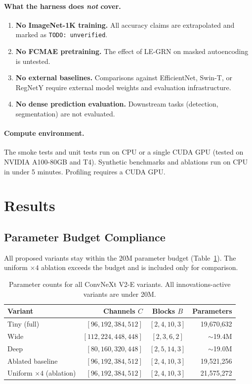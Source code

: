 \documentclass{article}
\begin{document}
\paragraph{What the harness does \emph{not} cover.}
\begin{enumerate}[nosep]
  \item \textbf{No ImageNet-1K training.}  All accuracy claims are
        extrapolated and marked as \texttt{TODO: unverified}.
  \item \textbf{No FCMAE pretraining.}  The effect of LE-GRN on
        masked autoencoding is untested.
  \item \textbf{No external baselines.}  Comparisons against
        EfficientNet, Swin-T, or RegNetY require external model
        weights and evaluation infrastructure.
  \item \textbf{No dense prediction evaluation.}  Downstream tasks
        (detection, segmentation) are not evaluated.
\end{enumerate}

\paragraph{Compute environment.}  The smoke tests and unit tests run on
CPU or a single CUDA GPU (tested on NVIDIA A100-80GB and T4).
Synthetic benchmarks and ablations run on CPU in under 5 minutes.
Profiling requires a CUDA GPU.

\section{Results}
\label{sec:results}

\subsection{Parameter Budget Compliance}

All proposed variants stay within the 20M parameter budget
(Table~\ref{tab:params}).  The uniform $\times4$ ablation exceeds the
budget and is included only for comparison.

\begin{table}[h]
  \centering
  \caption{Parameter counts for all ConvNeXt V2-E variants.
           All innovations-active variants are under 20M.}
  \label{tab:params}
  \begin{tabular}{lrcr}
  \toprule
  Variant & Channels $C$ & Blocks $B$ & Parameters \\
  \midrule
  Tiny (full)     & $[96,192,384,512]$ & $[2,4,10,3]$ & 19,670,632 \\
  Wide            & $[112,224,448,448]$ & $[2,3,6,2]$ & $\sim$19.4M \\
  Deep            & $[80,160,320,448]$ & $[2,5,14,3]$ & $\sim$19.0M \\
  Ablated baseline & $[96,192,384,512]$ & $[2,4,10,3]$ & 19,521,256 \\
  \midrule
  Uniform $\times4$ (ablation) & $[96,192,384,512]$ & $[2,4,10,3]$ & 21,575,272 \\
  \bottomrule
  \end{tabular}
\end{table}
\end{document}
